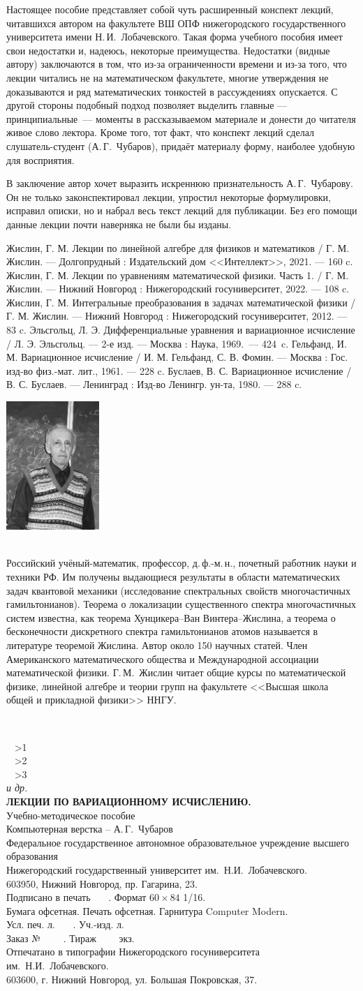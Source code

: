 \documentclass[10pt,a5paper,openany]{book}
\theoremstyle{definition}
\newcommand{\aboutauthor}{\newpage
	\thispagestyle{empty}
	{\centering\noindent\parbox{0.28\textwidth}{\includegraphics[width=0.264\textwidth]{Zhislin.jpg}}\parbox{0.67\textwidth}{\small\MakeUppercase{\athFA~\athNA}\\ \scriptsize Российский учёный-математик, профессор, д.\,ф.-м.\,н., почетный работник науки и техники РФ. Им получены выдающиеся результаты в области математических задач квантовой механики (исследование спектральных свойств многочастичных гамильтонианов). Теорема о локализации существенного спектра многочастичных систем известна, как теорема Хунцикера--Ван Винтера--Жислина, а теорема о бесконечности дискретного спектра гамильтонианов атомов называется в литературе теоремой Жислина. Автор около 150 научных статей. Член Американского математического общества и Международной ассоциации математической физики. Г.\,М.~Жислин читает общие курсы по математической физике, линейной алгебре и теории групп на факультете <<Высшая школа общей и прикладной физики>> ННГУ.}
		
}}
\newcommand{\lastpage}{
	\clearpage
	\thispagestyle{empty}
	~
	\vfill
	\begin{center}
		\athNA~\textbf{\athFA}
		\ifnum\numAuths>1\\\athNB~\textbf{\athFB}\fi
		\ifnum\numAuths>2\\\athNC~\textbf{\athFC}\fi
		\ifnum\numAuths>3\\\textit{и др.}\fi
		\\[12pt]
		\textbf{\MakeUppercase{\setTitle.}}\\[12pt]
		\setKind \\[24pt]
		Компьютерная верстка -- А.\,Г.~Чубаров\\[12pt]
		Федеральное государственное автономное образовательное учреждение высшего образования\\
		Нижегородский государственный университет им.~Н.И.~Лобачевского.\\
		603950, Нижний Новгород, пр. Гагарина, 23.\\[12pt]		
		Подписано в печать \ \ \ . Формат $60\times84$ 1/16.\\
		Бумага офсетная. Печать офсетная. Гарнитура Computer Modern.\\
		Усл. печ. л. \ \ \ . Уч.-изд. л.\\
		Заказ № \ \ \ \ . Тираж \ \ \ \ экз.\\[12pt]
		Отпечатано в типографии Нижегородского госуниверситета
		им.~Н.И.~Лобачевского.\\
		603600, г. Нижний Новгород, ул. Большая Покровская, 37.
	\end{center}
}
\newcommand{\setTitle}{Лекции по вариационному исчислению}
\newcommand{\numAuths}{1}
\newcommand{\setKind}{Учебно-методическое пособие}
\begin{document}
	Настоящее пособие представляет собой чуть расширенный конспект лекций, читавшихся автором на факультете ВШ ОПФ нижегородского государственного университета имени Н.\,И.~Лобачевского. Такая форма учебного пособия имеет свои недостатки и, надеюсь, некоторые преимущества. Недостатки (видные автору) заключаются в том, что из-за ограниченности времени и из-за того, что лекции читались не на математическом факультете, многие утверждения не доказываются и ряд математических тонкостей в рассуждениях опускается. С другой стороны подобный подход позволяет выделить главные --- принципиальные~--- моменты в рассказываемом материале и донести до читателя живое слово лектора. Кроме того, тот факт, что конспект лекций сделал слушатель-студент (А.\,Г.~Чубаров), придаёт материалу форму, наиболее удобную для восприятия.
	
	В заключение автор хочет выразить искреннюю признательность А.\,Г.~Чубарову. Он не только законспектировал лекции, упростил некоторые формулировки, исправил описки, но и набрал весь текст лекций для публикации. Без его помощи данные лекции почти наверняка не были бы изданы.

	
	
	
	
	
	
	
	
	
	

\begin{thebibliography}{99}
	\label{bibliography}
	 Жислин, Г. М. Лекции по линейной алгебре для физиков и математиков / Г. М. Жислин. --- Долгопрудный : Издательский дом <<Интеллект>>, 2021. --- 160 c.
	 Жислин, Г. М. Лекции по уравнениям математической физики. Часть 1.  / Г. М. Жислин. --- Нижний Новгород : Нижегородский госуниверситет, 2022. --- 108 c. 
	 Жислин, Г. М. Интегральные преобразования в задачах математической физики / Г. М. Жислин. --- Нижний Новгород : Нижегородский госуниверситет, 2012. --- 83 c.
	 Эльсгольц, Л. Э. Дифференциальные уравнения и вариационное исчисление / Л. Э. Эльсгольц. --- 2-е изд. --- Москва : Наука, 1969.~--- 424~c.
	 Гельфанд, И. М. Вариационное исчисление / И. М. Гельфанд, С. В. Фомин. --- Москва : Гос. изд-во физ.-мат. лит., 1961. --- 228 c.
	 Буслаев, В. С. Вариационное исчисление / В. С. Буслаев. --- Ленинград : Изд-во Ленингр. ун-та, 1980. --- 288 c.
\end{thebibliography}
\aboutauthor
\lastpage
\end{document}
